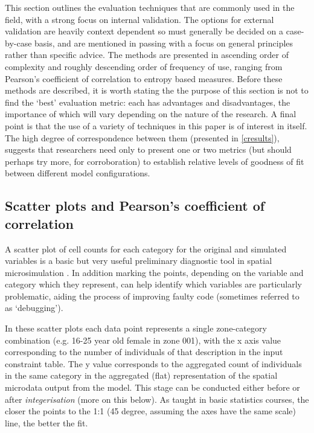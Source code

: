 \documentclass[a4paper,10pt]{article}
\begin{document}
This section outlines the evaluation techniques that are commonly used in the
field, with a strong focus on internal validation. The options for external
validation are heavily context dependent so must generally be decided on a
case-by-case basis, and are mentioned in passing with a focus on general principles
rather than specific advice. The methods are presented in ascending order of complexity
and roughly descending order of frequency of use, ranging from Pearson's coefficient of
correlation to entropy based measures. Before these methods are described, it is
worth stating the the purpose of this section is not to find the `best' evaluation metric:
each has advantages and disadvantages, the importance of which will vary depending on the
nature of the research. A final point is that the use of a variety of techniques in this paper
is of interest in itself. The high degree of correspondence between them (presented in \cref{cresults}),
suggests that researchers need only to present one or two metrics (but should
perhaps try more, for corroboration) to establish relative levels of goodness of fit between
different model configurations.

\subsection{Scatter plots and Pearson's coefficient of correlation}
A scatter plot of cell counts for each category for the original and simulated variables is
a basic but very useful preliminary diagnostic tool in spatial microsimulation
\citep{Ballas2005c,Edwards2009}.
In addition marking the points, depending on the
variable and category %
which they represent, can help identify which variables are particularly problematic,
aiding the process of improving faulty code (sometimes referred to as `debugging').

In these scatter plots each data point represents a single zone-category
combination (e.g. 16-25 year old female in zone 001), with the x axis value corresponding
to the number of individuals of that description in the input constraint table.
The y value corresponds to the
aggregated count of individuals in the same category in the aggregated
(flat) representation of the spatial microdata output from the model. %
This stage can be conducted either before or after \emph{integerisation}
(more on this below). As taught in basic statistics courses, the closer the points to the
1:1 (45 degree, assuming the axes have the same scale) line, the better the fit.
\end{document}
